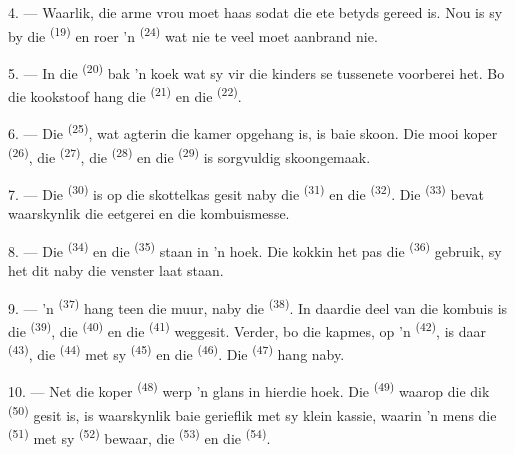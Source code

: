 4. --- Waarlik, die arme vrou moet haas sodat die ete betyds gereed is. Nou is sy by die
 \textsuperscript{(19)} en roer 'n 
\textsuperscript{(24)} wat nie te veel moet aanbrand nie.

5. --- In die  \textsuperscript{(20)} bak 'n koek wat sy vir die kinders se
tussenete voorberei het. Bo die kookstoof hang die 
\textsuperscript{(21)} en die  \textsuperscript{(22)}.

\VUsaut{4.0mm}
\VUsaut{3.0mm}

6. --- Die  \textsuperscript{(25)}, wat agterin die kamer opgehang is,
is baie skoon. Die mooi koper  \textsuperscript{(26)}, die
 \textsuperscript{(27)}, die  \textsuperscript{(28)} en die
 \textsuperscript{(29)} is sorgvuldig skoongemaak.

7. --- Die  \textsuperscript{(30)} is op die skottelkas gesit naby
die  \textsuperscript{(31)} en die 
\textsuperscript{(32)}. Die  \textsuperscript{(33)} bevat waarskynlik die
eetgerei en die kombuismesse.

8. --- Die  \textsuperscript{(34)} en die 
\textsuperscript{(35)} staan in 'n hoek. Die kokkin het pas die 
\textsuperscript{(36)} gebruik, sy het dit naby die venster laat staan.

9. --- 'n  \textsuperscript{(37)} hang teen die muur, naby die
 \textsuperscript{(38)}. In daardie deel van die kombuis is die
 \textsuperscript{(39)}, die  \textsuperscript{(40)} en
die  \textsuperscript{(41)} weggesit. Verder, bo die kapmes, op 'n
 \textsuperscript{(42)}, is daar  \textsuperscript{(43)},
die  \textsuperscript{(44)} met sy 
\textsuperscript{(45)} en die  \textsuperscript{(46)}. Die 
\textsuperscript{(47)} hang naby.

10. --- Net die koper  \textsuperscript{(48)} werp 'n glans in hierdie
hoek. Die  \textsuperscript{(49)} waarop die dik 
\textsuperscript{(50)} gesit is, is waarskynlik baie gerieflik met sy klein kassie,
waarin 'n mens die  \textsuperscript{(51)} met sy 
\textsuperscript{(52)} bewaar, die  \textsuperscript{(53)} en die
 \textsuperscript{(54)}.

